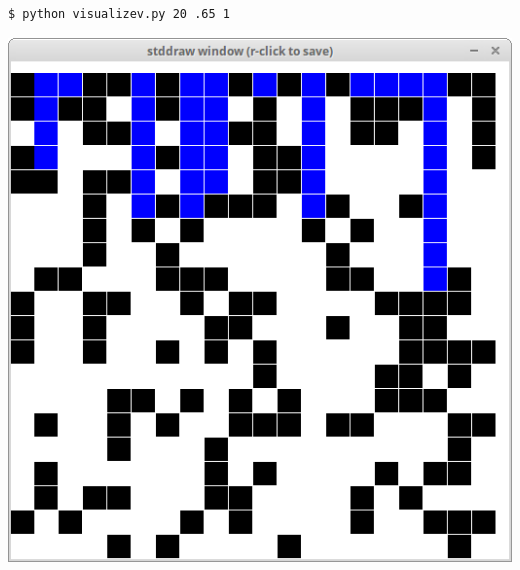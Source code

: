\documentclass[8pt,a4paper,compress,handout]{beamer}
\begin{document}
\begin{frame}[fragile]
\begin{minipage}{160pt}
\begin{lstlisting}[language={}]
$ python visualizev.py 20 .65 1
\end{lstlisting}
\end{minipage}%
\begin{minipage}{140pt}
\hfill \includegraphics[scale=0.15]{figures/percolation7.png}
\end{minipage}

\smallskip


\end{frame}
\end{document}
